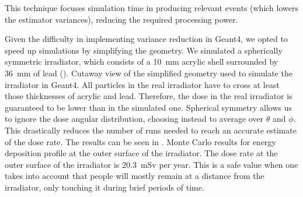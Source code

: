 This technique focuses simulation time in producing relevant events
(which lowers the estimator variances),
reducing the required processing power.

Given the difficulty in implementing variance reduction in Geant4,
we opted to speed up simulations by simplifying the geometry.
We simulated a spherically symmetric irradiator,
which consists of a \SI{10}{\milli\meter} acrylic shell 
surrounded by \SI{36}{\milli\meter} of lead (). 
{Cutaway view of the simplified geometry used to simulate the irradiator in Geant4.}
All particles in the real irradiator have to cross at least those thicknesses of acrylic and lead.
Therefore, the dose in the real irradiator is guaranteed to be lower than in the simulated one.
Spherical symmetry allows us to ignore the dose angular distribution,
choosing instead to average over $\theta$ and $\phi$.
This drastically reduces the number of runs needed to reach an accurate estimate of the dose rate.
The results can be seen in .
{Monte Carlo results for energy deposition profile at the outer surface of the irradiator.}
The dose rate at the outer surface of the irradiator is
\SI{20.3}{\milli\sievert} per year.
This is a safe value when one takes into account that
people will mostly remain at a distance from the irradiator,
only touching it during brief periods of time.

